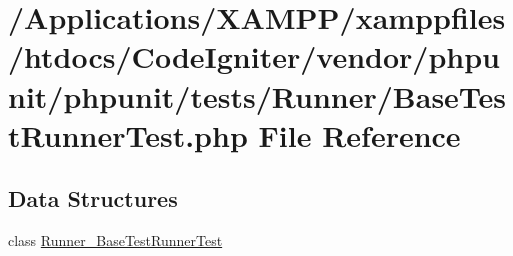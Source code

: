 \hypertarget{_base_test_runner_test_8php}{}\section{/\+Applications/\+X\+A\+M\+P\+P/xamppfiles/htdocs/\+Code\+Igniter/vendor/phpunit/phpunit/tests/\+Runner/\+Base\+Test\+Runner\+Test.php File Reference}
\label{_base_test_runner_test_8php}
\subsection*{Data Structures}
\begin{DoxyCompactItemize}
\item 
class \mbox{\hyperlink{class_runner___base_test_runner_test}{Runner\+\_\+\+Base\+Test\+Runner\+Test}}
\end{DoxyCompactItemize}
